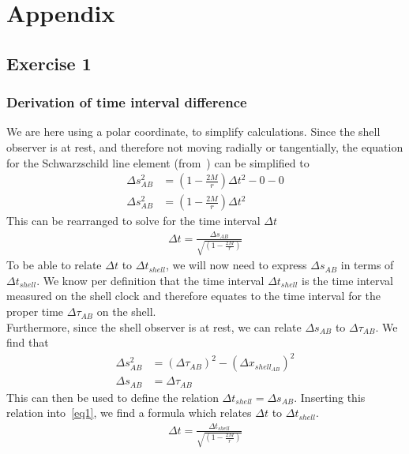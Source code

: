 \documentclass[reprint,english,notitlepage]{revtex4-2}
\begin{document}
\section{Appendix}\label{sec:appendix}
    \subsection{Exercise 1}\label{subsec:exercise-1}
        \subsubsection{Derivation of time interval difference}\label{subsec:derivation-of-time-interval-difference}
            We are here using a polar coordinate, to simplify calculations.
            Since the shell observer is at rest, and therefore not moving radially or tangentially, the equation for the Schwarzschild line element (from~\parencite[][page 3]{lecture2c}) can be simplified to
            \begin{align}
                \Delta s^2_{AB} &= \left(1-\frac{2M}{r}\right) \Delta t^2 - 0 - 0\\
                \Delta s^2_{AB} &= \left(1-\frac{2M}{r}\right) \Delta t^2
            \end{align}
            This can be rearranged to solve for the time interval $\Delta t$
            \begin{align}
                \Delta t = \frac{\Delta s_{AB}}{\sqrt{\left(1-\frac{2M}{r}\right)}} \label{eq1}
            \end{align}
            To be able to relate $\Delta t$ to $\Delta t_{shell}$, we will now need to express $\Delta s_{AB}$ in terms of $\Delta t_{shell}$.
            We know per definition that the time interval $\Delta t_{shell}$ is the time interval measured on the shell clock and therefore equates to the time interval for the proper time $\Delta \tau_{AB}$ on the shell.\\
            Furthermore, since the shell observer is at rest, we can relate $\Delta s_{AB}$ to $\Delta \tau_{AB}$.
            We find that
            \begin{align}
                \Delta s^2_{AB} &= (\Delta \tau_{AB})^2 - (\Delta x_{shell}_{AB})^2\\
                \Delta s_{AB} &= \Delta \tau_{AB}
            \end{align}
            This can then be used to define the relation $\Delta t_{shell} = \Delta s_{AB}$.
            Inserting this relation into~\eqref{eq1}, we find a formula which relates $\Delta t$ to $\Delta t_{shell}$.
            \begin{align}
                \Delta t = \frac{\Delta t_{shell}}{\sqrt{\left(1-\frac{2M}{r}\right)}}
            \end{align}
\end{document}
